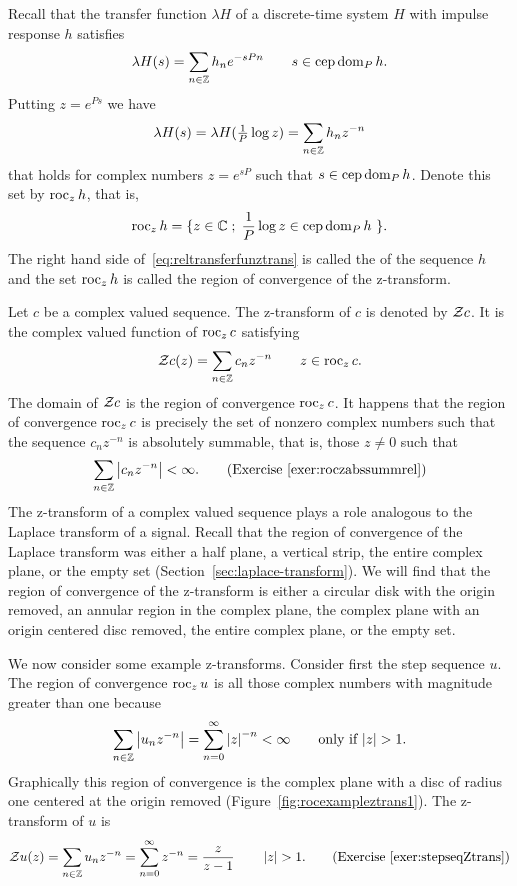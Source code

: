 Recall that the transfer function $\lambda H$ of a discrete-time system $H$ with impulse response $h$ satisfies
\[
\lambda H(s) = \sum_{n \in {\mathbb Z}} h_n e^{-sPn} \qquad s \in \operatorname{cep} \operatorname{dom}_P h.
\]
Putting $z = e^{Ps}$ we have
\begin{equation} \label{eq:reltransferfunztrans}
\lambda H(s) = \lambda H(\tfrac{1}{P} \log z) = \sum_{n \in {\mathbb Z}} h_n z^{-n} 
\end{equation}
that holds for complex numbers $z = e^{sP}$ such that $s \in \operatorname{cep}\operatorname{dom}_P h$.  Denote this set by $\operatorname{roc}_z h$, that is,
\[
\operatorname{roc}_z h = \{z \in {\mathbb C} \; ; \; \frac{1}{P} \log z \in \operatorname{cep} \operatorname{dom}_P h \ \}.
\]
The right hand side of~\eqref{eq:reltransferfunztrans} is called the  of the sequence $h$ and the set $\operatorname{roc}_z h$ is called the region of convergence of the z-transform.  


Let $c$ be a complex valued sequence.  The z-transform of $c$ is denoted by ${\mathcal Z} c$.  It is the complex valued function of $\operatorname{roc}_z c$ satisfying
\[
{\mathcal Z} c(z) = \sum_{n \in {\mathbb Z}} c_n z^{-n} \qquad z \in \operatorname{roc}_z c.
\]
The domain of ${\mathcal Z} c$ is the region of convergence $\operatorname{roc}_z c$.  It happens that the region of convergence $\operatorname{roc}_z c$ is precisely the set of nonzero complex numbers such that the sequence $c_n z^{-n}$ is absolutely summable, that is, those $z \neq 0$ such that
\[
\sum_{n \in {\mathbb Z}} \left\vert c_n z^{-n} \right\vert < \infty. \qquad \text{(Exercise~\ref{exer:roczabssummrel})}
\]
The z-transform of a complex valued sequence plays a role analogous to the Laplace transform of a signal.  Recall that the region of convergence of the Laplace transform was either a half plane, a vertical strip, the entire complex plane, or the empty set (Section~\ref{sec:laplace-transform}).  We will find that the region of convergence of the z-transform is either a circular disk with the origin removed, an annular region in the complex plane, the complex plane with an origin centered disc removed, the entire complex plane, or the empty set.

We now consider some example z-transforms.  Consider first the step sequence $u$.  The region of convergence $\operatorname{roc}_z u$ is all those complex numbers with magnitude greater than one because
\[
\sum_{n\in{\mathbb Z}} \left\vert u_n z^{-n} \right\vert = \sum_{n=0}^\infty \left\vert z \right\vert^{-n} < \infty \qquad \text{only if $\left\vert z \right\vert > 1$}.
\]
Graphically this region of convergence is the complex plane with a disc of radius one centered at the origin removed (Figure~\ref{fig:rocexampleztrans1}).  The z-transform of $u$ is
\[
{\mathcal Z} u(z) = \sum_{n \in {\mathbb Z}} u_n z^{-n} = \sum_{n=0}^\infty z^{-n} = \frac{z}{z - 1} \qquad \left\vert z \right\vert > 1. \qquad \text{(Exercise~\ref{exer:stepseqZtrans})}
\]

